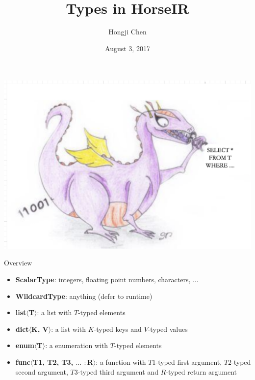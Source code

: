 \documentclass{beamer}
\title{Types in HorseIR}
\author{Hongji Chen}
\date{August 3, 2017}
\begin{document}
    
\maketitle

\begin{frame}
\includegraphics[width=\textwidth]{logo-dragon}
\end{frame}

\begin{frame}{Overview}
\begin{itemize}
    \item \textbf{ScalarType}: 
          integers, floating point numbers, characters, $\dots$
    \item \textbf{WildcardType}: 
          anything (defer to runtime)
    \item \textbf{list$\langle$T$\rangle$}: 
          a list with $T$-typed elements
    \item \textbf{dict$\langle$K, V$\rangle$}: 
          a list with $K$-typed keys and $V$-typed values
    \item \textbf{enum$\langle$T$\rangle$}: 
          a enumeration with $T$-typed elements
    \item \textbf{func$\langle$T1, T2, T3, $\dots$ $:$R$\rangle$}: 
          a function with $T1$-typed first argument, $T2$-typed second
          argument, $T3$-typed third argument and $R$-typed return argument
\end{itemize}
\end{frame}
\end{document}
